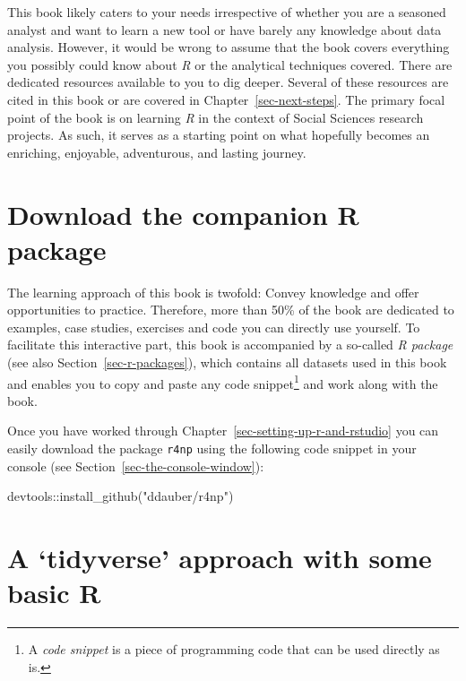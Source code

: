\documentclass[
  letterpaper,
]{krantz}
\makeatletter
\newenvironment{Shaded}{\begin{snugshade}}{\end{snugshade}}
\newcommand{\FunctionTok}[1]{\textcolor[rgb]{0.28,0.35,0.67}{#1}}
\newcommand{\NormalTok}[1]{\textcolor[rgb]{0.00,0.23,0.31}{#1}}
\newcommand{\SpecialCharTok}[1]{\textcolor[rgb]{0.37,0.37,0.37}{#1}}
\newcommand{\StringTok}[1]{\textcolor[rgb]{0.13,0.47,0.30}{#1}}
\newenvironment{kframe}{%
\medskip{}
\setlength{\fboxsep}{.8em}
 \def\at@end@of@kframe{}%
 \ifinner\ifhmode%
  \def\at@end@of@kframe{\end{minipage}}%
  \begin{minipage}{\columnwidth}%
 \fi\fi%
 \def\FrameCommand##1{\hskip\@totalleftmargin \hskip-\fboxsep
 \colorbox{shadecolor}{##1}\hskip-\fboxsep
     \hskip-\linewidth \hskip-\@totalleftmargin \hskip\columnwidth}%
 \MakeFramed {\advance\hsize-\width
   \@totalleftmargin\z@ \linewidth\hsize
   \@setminipage}}%
 {\par\unskip\endMakeFramed%
 \at@end@of@kframe}
\renewenvironment{Shaded}{\begin{kframe}}{\end{kframe}}
\makeatother
\begin{document}
This book likely caters to your needs irrespective of whether you are a
seasoned analyst and want to learn a new tool or have barely any
knowledge about data analysis. However, it would be wrong to assume that
the book covers everything you possibly could know about \emph{R} or the
analytical techniques covered. There are dedicated resources available
to you to dig deeper. Several of these resources are cited in this book
or are covered in Chapter~\ref{sec-next-steps}. The primary focal point
of the book is on learning \emph{R} in the context of Social Sciences
research projects. As such, it serves as a starting point on what
hopefully becomes an enriching, enjoyable, adventurous, and lasting
journey.

\section{Download the companion R
package}\label{sec-download-the-companion-r-package}

The learning approach of this book is twofold: Convey knowledge and
offer opportunities to practice. Therefore, more than 50\% of the book
are dedicated to examples, case studies, exercises and code you can
directly use yourself. To facilitate this interactive part, this book is
accompanied by a so-called \emph{R package} (see also
Section~\ref{sec-r-packages}), which contains all datasets used in this
book and enables you to copy and paste any code snippet\footnote{A
  \emph{code snippet} is a piece of programming code that can be used
  directly as is.} and work along with the book.

Once you have worked through Chapter~\ref{sec-setting-up-r-and-rstudio}
you can easily download the package \texttt{r4np} using the following
code snippet in your console (see Section~\ref{sec-the-console-window}):

\begin{Shaded}
\begin{Highlighting}[]
\NormalTok{devtools}\SpecialCharTok{::}\FunctionTok{install\_github}\NormalTok{(}\StringTok{"ddauber/r4np"}\NormalTok{)}
\end{Highlighting}
\end{Shaded}

\section{A `tidyverse' approach with some basic
R}\label{sec-a-tidyverse-approach-with-some-basic-r}
\end{document}
